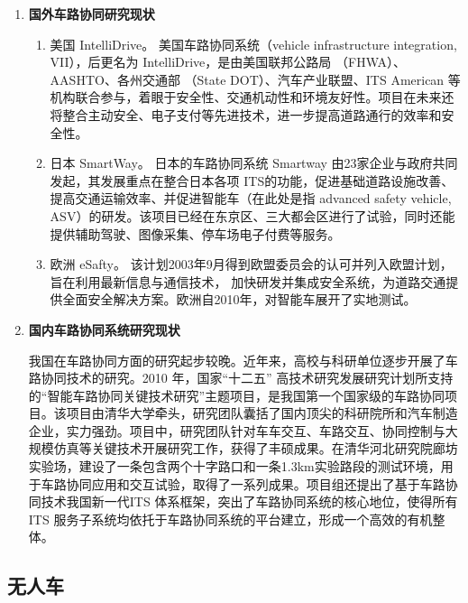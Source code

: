 \begin{enumerate}[wide=\parindent]
\item \textbf{国外车路协同研究现状}
\begin{enumerate}[wide=\parindent,label=(\arabic*)]
\item 美国  IntelliDrive。 美国车路协同系统（vehicle infrastructure integration, VII），后更名为 IntelliDrive，是由美国联邦公路局 （FHWA）、AASHTO、各州交通部 （State DOT）、汽车产业联盟、ITS American 等机构联合参与，着眼于安全性、交通机动性和环境友好性。项目在未来还将整合主动安全、电子支付等先进技术，进一步提高道路通行的效率和安全性。

\item 日本  SmartWay。 日本的车路协同系统 Smartway \cite{Hiroshi2005Smartway} 由23家企业与政府共同发起，其发展重点在整合日本各项 ITS的功能，促进基础道路设施改善、提高交通运输效率、并促进智能车（在此处是指 advanced safety vehicle, ASV）\cite{Chapman2010USING}的研发。该项目已经在东京区、三大都会区进行了试验，同时还能提供辅助驾驶、图像采集、停车场电子付费等服务。

\item 欧洲  eSafty。 该计划2003年9月得到欧盟委员会的认可并列入欧盟计划，旨在利用最新信息与通信技术，
加快研发并集成安全系统，为道路交通提供全面安全解决方案。欧洲自2010年，对智能车展开了实地测试。
\end{enumerate}

\item \textbf{国内车路协同系统研究现状}

我国在车路协同方面的研究起步较晚。近年来，高校与科研单位逐步开展了车路协同技术的研究\cite{Tian2010A,Danno2009VEHICLE}。2010 年，国家“十二五” 高技术研究发展研究计划所支持的“智能车路协同关键技术研究”主题项目，是我国第一个国家级的车路协同项目。该项目由清华大学牵头，研究团队囊括了国内顶尖的科研院所和汽车制造企业，实力强劲。项目中，研究团队针对车车交互、车路交互、协同控制与大规模仿真等关键技术开展研究工作，获得了丰硕成果。在清华河北研究院廊坊实验场，建设了一条包含两个十字路口和一条1.3km实验路段的测试环境，用于车路协同应用和交互试验，取得了一系列成果。项目组还提出了基于车路协同技术我国新一代ITS 体系框架，突出了车路协同系统的核心地位，使得所有ITS 服务子系统均依托于车路协同系统的平台建立，形成一个高效的有机整体。
\end{enumerate}

\subsection{无人车}
\label{sec:self}

